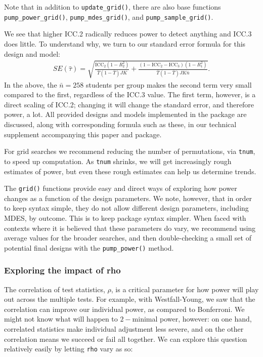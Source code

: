 \documentclass{article}
\begin{document}
Note that in addition to \texttt{update\_grid()}, there are also base
functions \texttt{pump\_power\_grid()}, \texttt{pump\_mdes\_grid()}, and
\texttt{pump\_sample\_grid()}.

We see that higher ICC.2 radically reduces power to detect anything and
ICC.3 does little. To understand why, we turn to our standard error
formula for this design and model: \[
\begin{aligned}
SE( \hat{\tau} ) = \sqrt{
\frac{\text{ICC}_{2}(1 - R^2_{2})}{\bar{T}(1 - \bar{T}) JK} +
\frac{(1-\text{ICC}_{2} - \text{ICC}_{3})(1-R^2_{1})}{\bar{T}(1 - \bar{T}) J K\bar{n}} } .
\end{aligned}
\] In the above, the \(\bar{n} = 258\) students per group makes the
second term very small compared to the first, regardless of the ICC.3
value. The first term, however, is a direct scaling of ICC.2; changing
it will change the standard error, and therefore power, a lot. All
provided designs and models implemented in the package are discussed,
along with corresponding formula such as these, in our technical
supplement accompanying this paper and package.

For grid searches we recommend reducing the number of permutations, via
\texttt{tnum}, to speed up computation. As \texttt{tnum} shrinks, we
will get increasingly rough estimates of power, but even these rough
estimates can help us determine trends.

The \texttt{grid()} functions provide easy and direct ways of exploring
how power changes as a function of the design parameters. We note,
however, that in order to keep syntax simple, they do not allow
different design parameters, including MDES, by outcome. This is to keep
package syntax simpler. When faced with contexts where it is believed
that these parameters do vary, we recommend using average values for the
broader searches, and then double-checking a small set of potential
final designs with the \texttt{pump\_power()} method.

\subsubsection{Exploring the impact of rho}

The correlation of test statistics, \(\rho\), is a critical parameter
for how power will play out across the multiple tests. For example, with
Westfall-Young, we saw that the correlation can improve our individual
power, as compared to Bonferroni. We might not know what will happen to
\(2-\)minimal power, however: on one hand, correlated statistics make
individual adjustment less severe, and on the other correlation means we
succeed or fail all together. We can explore this question relatively
easily by letting \texttt{rho} vary as so:
\end{document}
